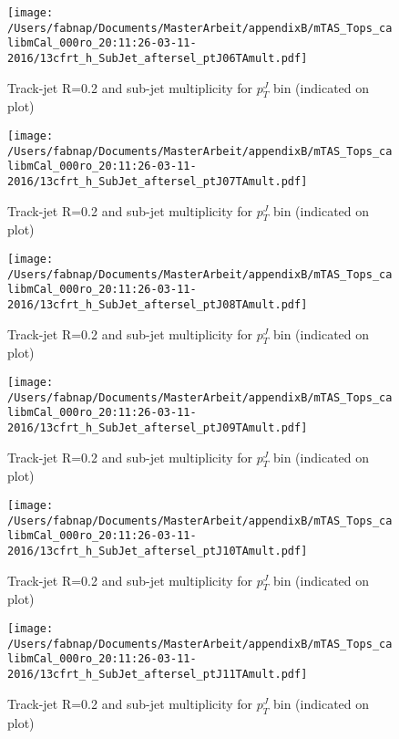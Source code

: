 \begin{figure}
 
\texttt{[image: /Users/fabnap/Documents/MasterArbeit/appendixB/mTAS\_Tops\_calibmCal\_000ro\_20:11:26-03-11-2016/13cfrt\_h\_SubJet\_aftersel\_ptJ06TAmult.pdf]}
\caption{Track-jet R=0.2 and sub-jet multiplicity for $p_{T}^{J}$ bin (indicated on plot) }
 
\end{figure}
\begin{figure}
 
\texttt{[image: /Users/fabnap/Documents/MasterArbeit/appendixB/mTAS\_Tops\_calibmCal\_000ro\_20:11:26-03-11-2016/13cfrt\_h\_SubJet\_aftersel\_ptJ07TAmult.pdf]}
\caption{Track-jet R=0.2 and sub-jet multiplicity for $p_{T}^{J}$ bin (indicated on plot) }
 
\end{figure}
 
\begin{figure}
 
\texttt{[image: /Users/fabnap/Documents/MasterArbeit/appendixB/mTAS\_Tops\_calibmCal\_000ro\_20:11:26-03-11-2016/13cfrt\_h\_SubJet\_aftersel\_ptJ08TAmult.pdf]}
\caption{Track-jet R=0.2 and sub-jet multiplicity for $p_{T}^{J}$ bin (indicated on plot) }
 
\end{figure}

\begin{figure}

\texttt{[image: /Users/fabnap/Documents/MasterArbeit/appendixB/mTAS\_Tops\_calibmCal\_000ro\_20:11:26-03-11-2016/13cfrt\_h\_SubJet\_aftersel\_ptJ09TAmult.pdf]}
\caption{Track-jet R=0.2 and sub-jet multiplicity for $p_{T}^{J}$ bin (indicated on plot) }
 
\end{figure}
 
\begin{figure}

\texttt{[image: /Users/fabnap/Documents/MasterArbeit/appendixB/mTAS\_Tops\_calibmCal\_000ro\_20:11:26-03-11-2016/13cfrt\_h\_SubJet\_aftersel\_ptJ10TAmult.pdf]}
\caption{Track-jet R=0.2 and sub-jet multiplicity for $p_{T}^{J}$ bin (indicated on plot) }

\end{figure}

\begin{figure}

\texttt{[image: /Users/fabnap/Documents/MasterArbeit/appendixB/mTAS\_Tops\_calibmCal\_000ro\_20:11:26-03-11-2016/13cfrt\_h\_SubJet\_aftersel\_ptJ11TAmult.pdf]}
\caption{Track-jet R=0.2 and sub-jet multiplicity for $p_{T}^{J}$ bin (indicated on plot) }

\end{figure}

